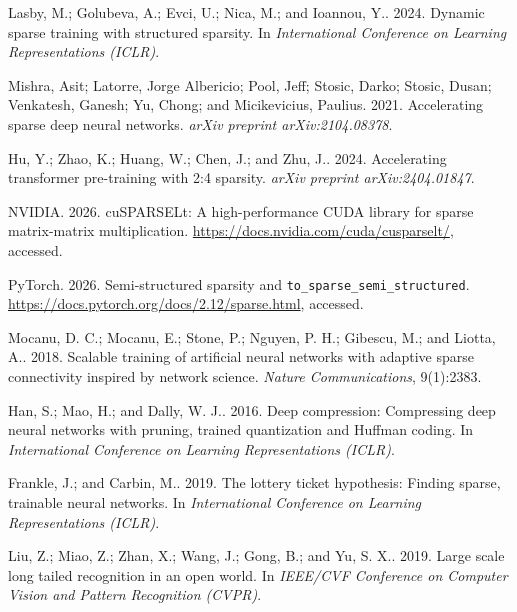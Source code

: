 Lasby, M.; Golubeva, A.; Evci, U.; Nica, M.; and Ioannou, Y.. 2024. 
\newblock Dynamic sparse training with structured sparsity. In {\em International Conference on Learning Representations (ICLR)}.

Mishra, Asit; Latorre, Jorge Albericio; Pool, Jeff; Stosic, Darko; Stosic, Dusan; Venkatesh, Ganesh; Yu, Chong; and Micikevicius, Paulius. 2021. 
\newblock Accelerating sparse deep neural networks. {\em arXiv preprint arXiv:2104.08378}.

Hu, Y.; Zhao, K.; Huang, W.; Chen, J.; and Zhu, J.. 2024. 
\newblock Accelerating transformer pre-training with 2:4 sparsity. {\em arXiv preprint arXiv:2404.01847}.

NVIDIA. 2026. 
\newblock cuSPARSELt: A high-performance CUDA library for sparse matrix-matrix multiplication. \url{https://docs.nvidia.com/cuda/cusparselt/}, accessed.

PyTorch. 2026. 
\newblock Semi-structured sparsity and \texttt{to\_sparse\_semi\_structured}. \url{https://docs.pytorch.org/docs/2.12/sparse.html}, accessed.

Mocanu, D. C.; Mocanu, E.; Stone, P.; Nguyen, P. H.; Gibescu, M.; and Liotta, A.. 2018. 
\newblock Scalable training of artificial neural networks with adaptive sparse connectivity inspired by network science. {\em Nature Communications}, 9(1):2383.

Han, S.; Mao, H.; and Dally, W. J.. 2016. 
\newblock Deep compression: Compressing deep neural networks with pruning, trained quantization and Huffman coding. In {\em International Conference on Learning Representations (ICLR)}.

Frankle, J.; and Carbin, M.. 2019. 
\newblock The lottery ticket hypothesis: Finding sparse, trainable neural networks. In {\em International Conference on Learning Representations (ICLR)}.

Liu, Z.; Miao, Z.; Zhan, X.; Wang, J.; Gong, B.; and Yu, S. X.. 2019. 
\newblock Large scale long tailed recognition in an open world. In {\em IEEE/CVF Conference on Computer Vision and Pattern Recognition (CVPR)}.

